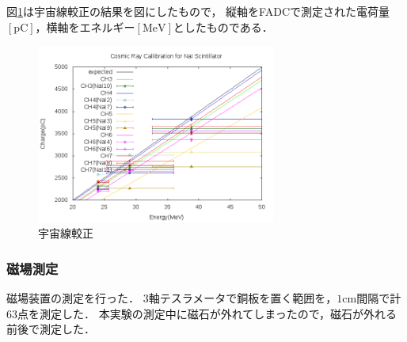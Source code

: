 図\ref{cali}は宇宙線較正の結果を図にしたもので，
縦軸をFADCで測定された電荷量$[\mathrm{pC}]$，横軸をエネルギー$[\mathrm{MeV}]$としたものである．
\begin{figure}[H]
  \centering
      \includegraphics[width=0.7\textwidth]{figure/tajima/fit.png}
      \caption{宇宙線較正}\label{cali}
\end{figure}
\newpage
\subsubsection{磁場測定}
磁場装置の測定を行った．
3軸テスラメータで銅板を置く範囲を，$1\mathrm{cm}$間隔で計63点を測定した．
本実験の測定中に磁石が外れてしまったので，磁石が外れる前後で測定した． 

